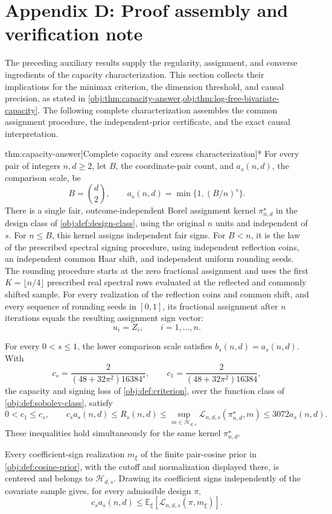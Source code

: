 \section{Appendix D: Proof assembly and verification note}

The preceding auxiliary results supply the regularity, assignment, and converse ingredients of the capacity characterization. This section collects their implications for the minimax criterion, the dimension threshold, and causal precision, as stated in \cref{obj:thm:capacity-answer,obj:thm:log-free-bivariate-capacity}. The following complete characterization assembles the common assignment procedure, the independent-prior certificate, and the exact causal interpretation.

\begin{theoremv}{thm:capacity-answer}[Complete capacity and excess characterization]*
For every pair of integers \(n,d\geq2\), let \(B\), the coordinate-pair count, and \(a_s(n,d)\), the comparison scale, be
\[
B=\binom d2,\qquad
a_s(n,d)=\min\{1,(B/n)^s\}.
\]
There is a single fair, outcome-independent Borel assignment kernel \(\pi^\star_{n,d}\) in the design class of \cref{obj:def:design-class}, using the original \(n\) units and independent of \(s\). For \(n\leq B\), this kernel assigns independent fair signs. For \(B<n\), it is the law of the prescribed spectral signing procedure, using independent reflection coins, an independent common Haar shift, and independent uniform rounding seeds. The rounding procedure starts at the zero fractional assignment and uses the first \(K=\lfloor n/4\rfloor\) prescribed real spectral rows evaluated at the reflected and commonly shifted sample. For every realization of the reflection coins and common shift, and every sequence of rounding seeds in \([0,1]\), its fractional assignment after \(n\) iterations equals the resulting assignment sign vector:
\[
u_i=Z_i,\qquad i=1,\ldots,n.
\]

For every \(0<s\leq1\), the lower comparison scale satisfies \(b_s(n,d)=a_s(n,d)\). With
\[
c_s=\frac{2}{(48+32\pi^2)16384^s},
\qquad
c_1=\frac{2}{(48+32\pi^2)16384},
\]
the capacity and signing loss of \cref{obj:def:criterion}, over the function class of \cref{obj:def:sobolev-class}, satisfy
\[
0<c_1\leq c_s,\qquad
c_sa_s(n,d)
\leq R_s(n,d)
\leq
\sup_{m\in\mathcal H_{d,s}}
\mathcal L_{n,d,s}(\pi^\star_{n,d},m)
\leq3072a_s(n,d).
\]
These inequalities hold simultaneously for the same kernel \(\pi^\star_{n,d}\).

Every coefficient-sign realization \(m_\xi\) of the finite pair-cosine prior in \cref{obj:def:cosine-prior}, with the cutoff and normalization displayed there, is centered and belongs to \(\mathcal H_{d,s}\). Drawing its coefficient signs independently of the covariate sample gives, for every admissible design \(\pi\),
\[
c_sa_s(n,d)
\leq
\mathbb E_\xi\!\left[\mathcal L_{n,d,s}(\pi,m_\xi)\right].
\]


\end{theoremv}
